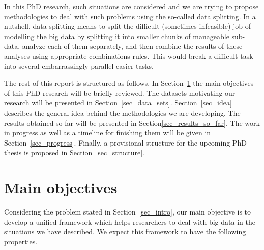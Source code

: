 \documentclass[14pt]{article}
\begin{document}
In this PhD research, such situations are considered and we are trying to propose methodologies to deal with such problems using the so-called data splitting. In a nutshell, data splitting means to split the difficult (sometimes infeasible) job of modelling the big data by splitting it into smaller chunks of manageable sub-data, analyze each of them separately, and then combine the results of these analyses using appropriate combinations rules. This would break a difficult task into several embarrassingly parallel easier tasks.

The rest of this report is structured as follows. In Section~\ref{sec_objective} the main objectives of this PhD research will be briefly reviewed. The datasets motivating our research will be presented in Section~\ref{sec_data_sets}. Section~\ref{sec_idea} describes the general idea behind the methodologies we are developing. The results obtained so far will be presented in Section\ref{sec_results_so_far}. The work in progress as well as a timeline for finishing them will be given in Section~\ref{sec_progress}. Finally, a provisional structure for the upcoming PhD thesis is proposed in Section~\ref{sec_structure}. 

\section{Main objectives}
\label{sec_objective}
Considering the problem stated in Section~\ref{sec_intro}, our main objective is to develop a unified framework which helps researchers to deal with big data in the situations we have described. We expect this framework to have the following properties.
\end{document}
